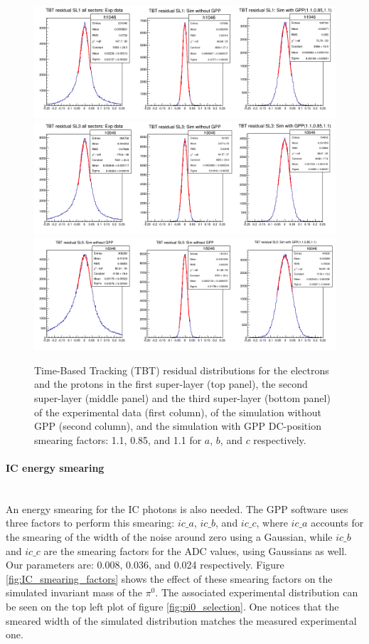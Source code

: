\begin{figure}[tbp]
\centering
\includegraphics[scale=0.47]{fig_simulation/Ele_SL1.png}
\includegraphics[scale=0.47]{fig_simulation/Ele_SL3.png}
\includegraphics[scale=0.47]{fig_simulation/Ele_SL5.png}
\caption{Time-Based Tracking (TBT) residual distributions for the electrons and the protons in the first super-layer (top panel), the second super-layer (middle panel) and the third super-layer (bottom panel) of the experimental data (first column), of the simulation without GPP (second column), and the simulation with GPP DC-position smearing factors: 1.1, 0.85, and 1.1 for $a$, $b$, and $c$ respectively. } 
\label{fig:DC_smearing_factors}
\end{figure}


\paragraph{IC energy smearing} ~\\
An energy smearing for the IC photons is also needed. The GPP software uses three factors to perform this smearing: $ic\_a$, $ic\_b$, and $ic\_c$, where $ic\_a$ accounts for the smearing of the width of the noise around zero using a Gaussian, while $ic\_b$ and $ic\_c$ are the smearing factors for the ADC values, using Gaussians as well. Our parameters are: 0.008, 0.036, and 0.024 respectively. Figure \ref{fig:IC_smearing_factors} shows the effect of these smearing factors on the simulated invariant mass of the $\pi^{0}$. The associated experimental distribution can be seen on the top left plot of figure \ref{fig:pi0_selection}. One notices that the smeared width of the simulated distribution matches the measured experimental one.

